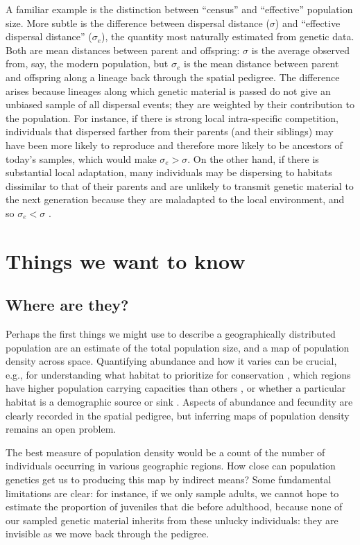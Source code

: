 \documentclass{ar-1col}
\begin{document}
A familiar example is the distinction between ``census'' and ``effective'' population size.
More subtle is the difference between dispersal distance ($\sigma$) and
``effective dispersal distance'' ($\sigma_e$),
the quantity most naturally estimated from genetic data.
Both are mean distances between parent and offspring:
$\sigma$ is the average observed from, say, the modern population,
but $\sigma_e$ is
the mean distance between parent and offspring along a lineage back through the spatial pedigree.
The difference arises because
lineages along which genetic material is passed do not give an unbiased sample of all dispersal events;
they are weighted by their contribution to the population.
For instance, if there is strong local intra-specific competition,
individuals that dispersed farther from their parents (and their siblings)
may have been more likely to reproduce and therefore more likely to be ancestors of today's samples,
which would make $\sigma_e > \sigma$.
On the other hand, if there is substantial local adaptation,
many individuals may be dispersing to habitats dissimilar to that of their parents
and are unlikely to transmit genetic material to the next generation
because they are maladapted to the local environment,
and so $\sigma_e < \sigma$
\citep[for a review, see][]{wangbradburd2014}.


\section{Things we want to know}

\subsection{Where are they?}

Perhaps the first things we might use
to describe a geographically distributed population
are an estimate of the total population size,
and a map of population density across space.
Quantifying abundance and how it varies
can be crucial, e.g., for understanding
what habitat to prioritize for conservation \citep{zipkin2018synthesizing}, 
which regions have higher population carrying capacities than others \citep{roughgarden1974}, 
or whether a particular habitat is a demographic source or sink 
\citep{pulliam1988sources}.
Aspects of abundance and fecundity are clearly recorded in the spatial pedigree,
but inferring maps of population density
remains an open problem.

The best measure of population density
would be a count of the number of individuals occurring in various geographic regions.
How close can population genetics get us to producing this map by indirect means?
Some fundamental limitations are clear:
for instance, if we only sample adults,
we cannot hope to estimate the proportion of juveniles that die before adulthood,
because none of our sampled genetic material inherits from these unlucky individuals:
they are invisible as we move back through the pedigree.
\end{document}
